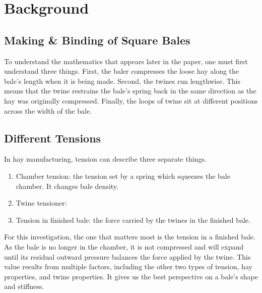 \section{Background}
\subsection{Making \& Binding of Square Bales}
To understand the mathematics that appears later in the paper, one must first understand three things. First, the baler compresses the loose hay along the bale's length when it is being made. Second, the twines run lengthwise. This means that the twine restrains the bale's spring back in the same direction as the hay was originally compressed. Finally, the loops of twine sit at different positions across the width of the bale.

\subsection{Different Tensions}
In hay manufacturing, tension can describe three separate things.
\begin{enumerate}
	\item Chamber tension: the tension set by a spring which squeezes the bale chamber. It changes bale density.
	\item Twine tensioner: %
	\item Tension in finished bale: the force carried by the twines in the finished bale.
\end{enumerate}
For this investigation, the one that matters most is the tension in a finished bale. As the bale is no longer in the chamber, it is not compressed and will expand until its residual outward pressure balances the force applied by the twine. This value results from multiple factors, including the other two types of tension, hay properties, and twine properties. It gives us the best perspective on a bale's shape and stiffness.

